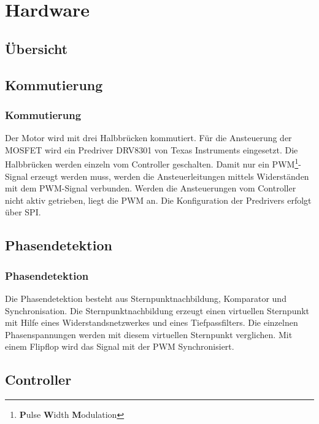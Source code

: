 \ifSTANDALONE
\section{Hardware}
\fi

\subsection{Übersicht}

\ifSTANDALONE
\subsection{Kommutierung}
\fi
\ifEMBED
\subsubsection{Kommutierung}
\fi
Der Motor wird mit drei Halbbrücken kommutiert. Für die Ansteuerung der MOSFET 
wird ein Predriver DRV8301 von Texas Instruments eingesetzt. Die Halbbrücken 
werden einzeln vom Controller geschalten. Damit nur ein 
PWM\footnote{\textbf{P}ulse \textbf{W}idth \textbf{M}odulation}-Signal erzeugt 
werden muss, werden die Ansteuerleitungen mittels Widerständen mit dem 
PWM-Signal verbunden. Werden die Ansteuerungen vom Controller nicht aktiv 
getrieben, liegt die PWM an. Die Konfiguration der Predrivers erfolgt über SPI. 

\ifSTANDALONE
\subsection{Phasendetektion}
\fi
\ifEMBED
\subsubsection{Phasendetektion}
\fi
Die Phasendetektion besteht aus Sternpunktnachbildung, Komparator und 
Synchronisation. Die Sternpunktnachbildung erzeugt einen virtuellen Sternpunkt 
mit Hilfe eines Widerstandsnetzwerkes und eines Tiefpassfilters. Die einzelnen 
Phasenspannungen werden mit diesem virtuellen Sternpunkt verglichen. Mit einem 
Flipflop wird das Signal mit der PWM Synchronisiert. 

\ifSTANDALONE
\subsection{Controller}
\fi
\ifEMBED
